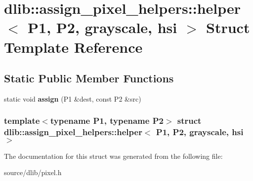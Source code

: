 \hypertarget{structdlib_1_1assign__pixel__helpers_1_1helper_3_01P1_00_01P2_00_01grayscale_00_01hsi_01_4}{
\section{dlib::assign\_\-pixel\_\-helpers::helper$<$ P1, P2, grayscale, hsi $>$ Struct Template Reference}
\label{structdlib_1_1assign__pixel__helpers_1_1helper_3_01P1_00_01P2_00_01grayscale_00_01hsi_01_4}
}
\subsection*{Static Public Member Functions}
\begin{DoxyCompactItemize}
\item 
\hypertarget{structdlib_1_1assign__pixel__helpers_1_1helper_3_01P1_00_01P2_00_01grayscale_00_01hsi_01_4_af5a7ba3c1c06868c0f7b51e1eb7e47c3}{
static void {\bfseries assign} (P1 \&dest, const P2 \&src)}
\label{structdlib_1_1assign__pixel__helpers_1_1helper_3_01P1_00_01P2_00_01grayscale_00_01hsi_01_4_af5a7ba3c1c06868c0f7b51e1eb7e47c3}

\end{DoxyCompactItemize}
\subsubsection*{template$<$typename P1, typename P2$>$ struct dlib::assign\_\-pixel\_\-helpers::helper$<$ P1, P2, grayscale, hsi $>$}



The documentation for this struct was generated from the following file:\begin{DoxyCompactItemize}
\item 
source/dlib/pixel.h\end{DoxyCompactItemize}
